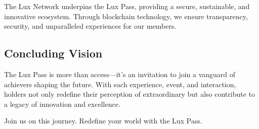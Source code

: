\documentclass[11pt]{article}
\begin{document}
The Lux Network underpins the Lux Pass, providing a secure, sustainable, and innovative ecosystem. Through blockchain technology, we ensure transparency, security, and unparalleled experiences for our members.


\subsection{Concluding Vision}

The Lux Pass is more than access---it's an invitation to join a vanguard of achievers shaping the future. With each experience, event, and interaction, holders not only redefine their perception of extraordinary but also contribute to a legacy of innovation and excellence.


Join us on this journey. Redefine your world with the Lux Pass.
\end{document}
